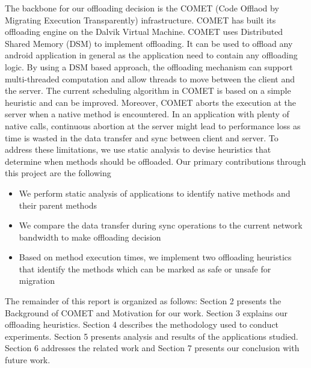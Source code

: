 The backbone for our offloading decision is the COMET (Code Offlaod by Migrating Execution Transparently)
infrastructure. COMET has built its offloading engine
on the Dalvik Virtual Machine. COMET uses Distributed Shared Memory (DSM) to implement offloading. It can be used to offload
any android application in general as the application need to contain any offloading logic. By using a DSM based approach, the
offloading mechanism can support multi-threaded computation and allow threads to move between the client and the server.
The current scheduling algorithm in COMET is based on a simple heuristic and can be improved. Moreover, COMET aborts the
execution at the server when a native method is encountered. In an application with plenty of native calls, continuous abortion
at the server might lead to performance loss as time is wasted in the data transfer and sync between client and server.
To address these limitations, we use static analysis to devise heuristics that determine when methods should be offloaded.
\newline
\newline
Our primary contributions through this project are the following
\begin{itemize}
   \item We perform static analysis of applications to identify native methods and their parent methods
   \item We compare the data transfer during sync operations to the current network bandwidth to make offloading decision
   \item Based on method execution times, we implement two offloading heuristics that identify the methods which can be marked
   as safe or unsafe for migration
\end{itemize}
\vspace{2mm}
The remainder of this report is organized as follows: Section 2 presents the Background of COMET and Motivation for our work.
Section 3 explains our offloading heuristics. Section 4 describes the methodology used to conduct experiments. Section 5 presents
analysis and results of the applications studied. Section 6 addresses the related work and Section 7 presents our conclusion with
future work.
